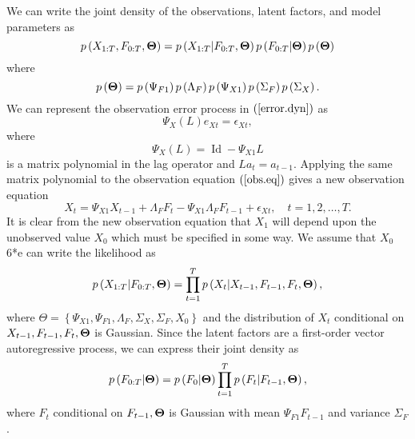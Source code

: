 We can write the joint density of the observations, latent factors, and model parameters as
\begin{equation}
	p \left( X_{1:T}, F_{0:T}, {\bf \Theta} \right) = p \left( X_{1:T} | F_{0:T}, {\bf \Theta}  \right) 	p \left( F_{0:T} | {\bf \Theta} \right)  p \left( {\bf \Theta} \right) 
\end{equation}
where
\begin{equation}
	p \left( {\bf \Theta} \right) = p \left( \Psi_{F1} \right) p \left( \Lambda_F \right) p \left( \Psi_{X1} \right) p \left( \Sigma_F \right) p \left( \Sigma_X \right).
\end{equation}
We can represent the observation error process in $(\ref{error.dyn})$ as
\begin{equation}
	\Psi_{X}(L) e_{Xt} = \epsilon_{Xt},
\end{equation}
where 
\begin{equation*}
	\Psi_{X}(L) = \operatorname{Id} - \Psi_{X1} L
\end{equation*}
is a matrix polynomial in the lag operator and $L a_t = a_{t-1}$. Applying the same matrix polynomial to the observation equation $(\ref{obs.eq})$ gives a new observation equation
\begin{equation}
	X_t = \Psi_{X1} X_{t-1} + \Lambda_F F_t - \Psi_{X1} \Lambda_F F_{t-1} + \epsilon_{Xt} \label{new.obs.eq}, \quad t = 1, 2, \ldots, T.
\end{equation}
It is clear from the new observation equation that $X_1$ will depend upon the unobserved value $X_0$ which must be specified in some way. We assume that $X_0$6*e can write the likelihood as 
\begin{equation}
	p \left( X_{1:T} | F_{0:T}, {\bf \Theta}  \right) = \prod_{t=1}^T p \left( X_t | X_{t-1}, F_{t-1}, F_t, {\bf \Theta} \right),
\end{equation}
where $\Theta = \left\{ \Psi_{X1}, \Psi_{F1}, \Lambda_F, \Sigma_X, \Sigma_F, X_0 \right\}$ and the distribution of $X_t$ conditional on $X_{t-1}, F_{t-1}, F_t, {\bf \Theta}$ is Gaussian. Since the latent factors are a first-order vector autoregressive process, we can express their joint density as
\begin{equation}
	p \left( F_{0:T} | {\bf \Theta} \right) = p \left( F_0 | {\bf \Theta} \right) \prod_{t=1}^T p \left( F_t | F_{t-1}, {\bf \Theta} \right),
\end{equation}
where $F_t$ conditional on $F_{t-1}, {\bf \Theta}$ is Gaussian with mean $\Psi_{F1} F_{t-1}$ and variance $\Sigma_F$.

